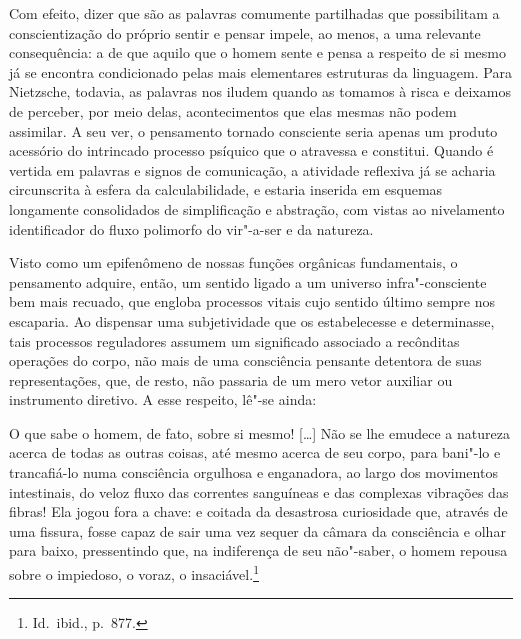 Com efeito, dizer que são as palavras comumente partilhadas que
possibilitam a conscientização do próprio sentir e pensar impele,
ao menos, a uma relevante consequência: a de que aquilo que o homem
sente e pensa a respeito de si mesmo já se encontra
condicionado pelas mais elementares estruturas da linguagem. 
Para Nietzsche, todavia, as palavras nos iludem quando as
tomamos à risca e deixamos de perceber, por meio delas, acontecimentos
que elas mesmas não podem assimilar. A seu ver, o pensamento 
tornado consciente seria apenas um produto acessório do intrincado
processo psíquico que o atravessa e constitui. 
Quando é vertida em palavras e
signos de comunicação, a atividade reflexiva já se acharia circunscrita
à esfera da calculabilidade, e estaria inserida em esquemas longamente
consolidados de simplificação e abstração, com vistas ao nivelamento
identificador do fluxo polimorfo do vir"-a{}-ser e da natureza.

Visto como um epifenômeno de nossas funções orgânicas fundamentais, o
pensamento adquire, então, um sentido ligado a um universo
infra"-consciente bem mais recuado, que engloba processos vitais cujo
sentido último sempre nos escaparia. Ao dispensar uma subjetividade que
os estabelecesse e determinasse, tais processos reguladores assumem
um significado associado a recônditas operações do corpo, não mais de
uma consciência pensante detentora de suas representações, que, de
resto, não passaria de um mero vetor auxiliar ou instrumento diretivo.
A esse respeito, lê"-se ainda:

\begin{hedraquote}
O que sabe o homem, de fato, sobre si mesmo! [\ldots{}] Não se lhe emudece
a natureza acerca de todas as outras coisas, até mesmo acerca de seu
corpo, para bani"-lo e trancafiá{}-lo numa consciência orgulhosa e
enganadora, ao largo dos movimentos intestinais, do veloz fluxo das
correntes sanguíneas e das complexas vibrações das fibras! Ela jogou
fora a chave: e coitada da desastrosa curiosidade que, através de uma
fissura, fosse capaz de sair uma vez sequer da câmara da consciência e
olhar para baixo, pressentindo que, na indiferença de seu não"-saber,
o homem repousa sobre o impiedoso, o voraz, o
insaciável.\footnote{ Id.~ibid., p.~877.}
\end{hedraquote}

